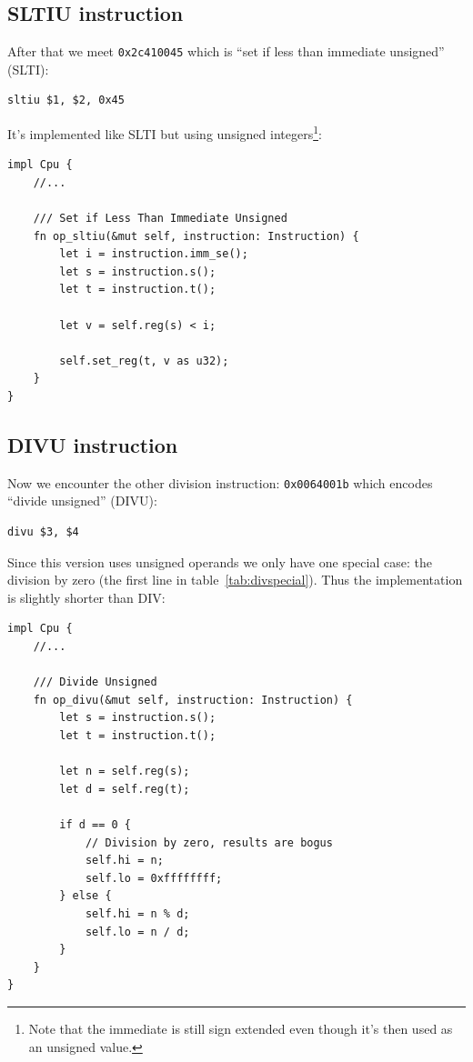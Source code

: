 \documentclass[a4paper]{article}
\newcommand{\code}[1] {\texttt{#1}}
\begin{document}
\subsection{SLTIU instruction}

After that we meet \code{0x2c410045} which is ``set if
less than immediate unsigned'' (SLTI):

\begin{lstlisting}[language=assembly]
sltiu $1, $2, 0x45
\end{lstlisting}

It's implemented like SLTI but using unsigned integers\footnote{Note
  that the immediate is still sign extended even though it's then used
  as an unsigned value.}:

\begin{lstlisting}
impl Cpu {
    //...

    /// Set if Less Than Immediate Unsigned
    fn op_sltiu(&mut self, instruction: Instruction) {
        let i = instruction.imm_se();
        let s = instruction.s();
        let t = instruction.t();

        let v = self.reg(s) < i;

        self.set_reg(t, v as u32);
    }
}
\end{lstlisting}

\subsection{DIVU instruction}

Now we encounter the other division instruction: \code{0x0064001b}
which encodes ``divide unsigned'' (DIVU):

\begin{lstlisting}[language=assembly]
divu $3, $4
\end{lstlisting}

Since this version uses unsigned operands we only have one special
case: the division by zero (the first line in
table~\ref{tab:divspecial}). Thus the implementation is slightly
shorter than DIV:

\begin{lstlisting}
impl Cpu {
    //...

    /// Divide Unsigned
    fn op_divu(&mut self, instruction: Instruction) {
        let s = instruction.s();
        let t = instruction.t();

        let n = self.reg(s);
        let d = self.reg(t);

        if d == 0 {
            // Division by zero, results are bogus
            self.hi = n;
            self.lo = 0xffffffff;
        } else {
            self.hi = n % d;
            self.lo = n / d;
        }
    }
}
\end{lstlisting}
\end{document}
